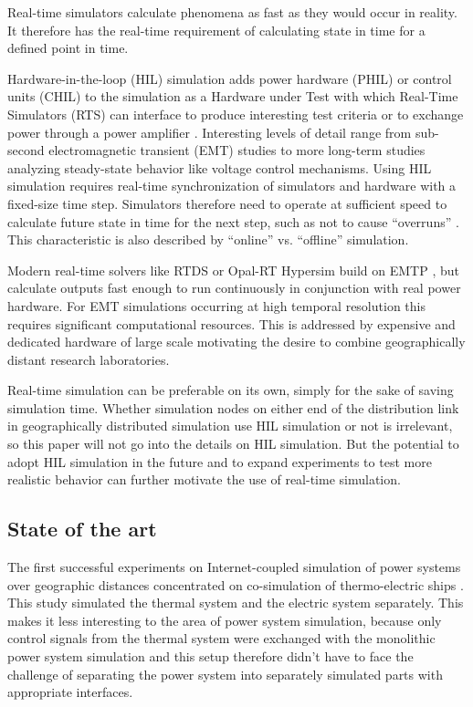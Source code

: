 \documentclass[a4paper]{atseminar}
\begin{document}
Real-time simulators calculate phenomena as fast as they would occur in reality. It therefore has the real-time requirement of calculating state in time for a defined point in time.

Hardware-in-the-loop (HIL) simulation adds power hardware (PHIL) or control units (CHIL) to the simulation as a Hardware under Test with which Real-Time Simulators (RTS) can interface to produce interesting test criteria or to exchange power through a power amplifier \cite{deJong2012}. Interesting levels of detail range from sub-second electromagnetic transient (EMT) studies to more long-term studies analyzing steady-state behavior like voltage control mechanisms.
Using HIL simulation requires real-time synchronization of simulators and hardware with a fixed-size time step. Simulators therefore need to operate at sufficient speed to calculate future state in time for the next step, such as not to cause ``overruns'' \cite{belanger2010}. This characteristic is also described by ``online'' vs. ``offline'' simulation. 

Modern real-time solvers like RTDS \cite{rtds} or Opal-RT Hypersim \cite{opal-rt} build on EMTP \cite{dommel1964}, but calculate outputs fast enough to run continuously in conjunction with real power hardware. For EMT simulations occurring at high temporal resolution this requires significant computational resources. This is addressed by expensive and dedicated hardware of large scale motivating the desire to combine geographically distant research laboratories.

Real-time simulation can be preferable on its own, simply for the sake of saving simulation time. Whether simulation nodes on either end of the distribution link in geographically distributed simulation use HIL simulation or not is irrelevant, so this paper will not go into the details on HIL simulation. But the potential to adopt HIL simulation in the future and to expand experiments to test more realistic behavior can further motivate the use of real-time simulation.


\subsection{State of the art}
\label{MH:sec:art}



The first successful experiments on Internet-coupled simulation of power systems over geographic distances concentrated on co-simulation of thermo-electric ships \cite{faruque2009a, faruque2009b}. This study simulated the thermal system and the electric system separately. This makes it less interesting to the area of power system simulation, because only control signals from the thermal system were exchanged with the monolithic power system simulation and this setup therefore
didn't have to face the challenge of separating the power system into separately simulated parts with appropriate interfaces.
\end{document}
